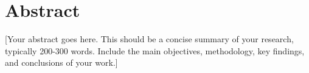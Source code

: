 \documentclass[12pt]{report}
\begin{document}
\newpage
\chapter*{Abstract}

[Your abstract goes here. This should be a concise summary of your research, typically 200-300 words. Include the main objectives, methodology, key findings, and conclusions of your work.]

\newpage
\tableofcontents
\newpage

\setcounter{page}{1}




\printbibliography[title=References]
\end{document}
